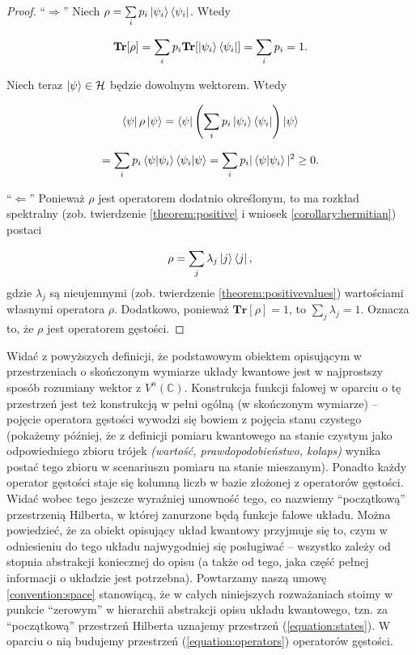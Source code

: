 \begin{proof}
    ``$\Longrightarrow$'' Niech $\rho = \sum\limits_{i} p_{i} \ket{\psi_i} \bra{\psi_i}$. Wtedy

    $$
        \textbf{Tr}[\rho] = \sum\limits_{i} p_{i} \textbf{Tr}[\ket{\psi_i} \bra{\psi_i}] = \sum\limits_{i} p_{i} = 1.
    $$

    Niech teraz $\ket{\psi} \in \mathcal{H}$ będzie dowolnym wektorem. Wtedy

    $$
        \bra{\psi} \rho \ket{\psi} = \bra{\psi} \left(\sum\limits_{i} p_{i} \ket{\psi_i} \bra{\psi_i}\right) \ket{\psi}
    $$

    $$
        = \sum\limits_{i} p_{i} \bra{\psi}\ket{\psi_i} \bra{\psi_i}\ket{\psi} = \sum\limits_{i} p_{i} |\bra{\psi}\ket{\psi_i}| ^ 2 \geq 0.
    $$

    ``$\Longleftarrow$'' Ponieważ $\rho$ jest operatorem dodatnio określonym, to ma rozkład spektralny (zob. twierdzenie \ref{theorem:positive} i wniosek \ref{corollary:hermitian}) postaci

    $$
        \rho = \sum\limits_{j} \lambda_{j} \ket{j} \bra{j},
    $$
    gdzie $\lambda_j$ są nieujemnymi (zob. twierdzenie \ref{theorem:positivevalues}) wartościami własnymi operatora $\rho$. Dodatkowo, ponieważ $\textbf{Tr}[\rho] = 1$, to $\sum\limits_{j} \lambda_{j} = 1$. Oznacza to, że $\rho$ jest operatorem gęstości.
\end{proof}

Widać z powyższych definicji, że podstawowym obiektem opisującym w przestrzeniach o skończonym wymiarze układy kwantowe jest w najprostszy sposób rozumiany wektor z $V ^ n(\mathbb{C})$. Konstrukcja funkcji falowej w oparciu o tę przestrzeń jest też konstrukcją w pełni ogólną (w skończonym wymiarze) -- pojęcie operatora gęstości wywodzi się bowiem z pojęcia stanu czystego (pokażemy później, że z definicji pomiaru kwantowego na stanie czystym jako odpowiedniego zbioru trójek \textit{(wartość, prawdopodobieństwo, kolaps)} wynika postać tego zbioru w scenariuszu pomiaru na stanie mieszanym). Ponadto każdy operator gęstości staje się kolumną liczb w bazie złożonej z operatorów gęstości. Widać wobec tego jeszcze wyraźniej umowność tego, co nazwiemy ``początkową'' przestrzenią Hilberta, w której zanurzone będą funkcje falowe układu. Można powiedzieć, że za obiekt opisujący układ kwantowy przyjmuje się to, czym w odniesieniu do tego układu najwygodniej się posługiwać -- wszystko zależy od stopnia abstrakcji koniecznej do opisu (a także od tego, jaka część pełnej informacji o układzie jest potrzebna). Powtarzamy naszą umowę \ref{convention:space} stanowiącą, że w całych niniejszych rozważaniach stoimy w punkcie ``zerowym'' w hierarchii abstrakcji opisu układu kwantowego, tzn. za ``początkową'' przestrzeń Hilberta uznajemy przestrzeń (\ref{equation:states}). W oparciu o nią budujemy przestrzeń (\ref{equation:operators}) operatorów gęstości.

